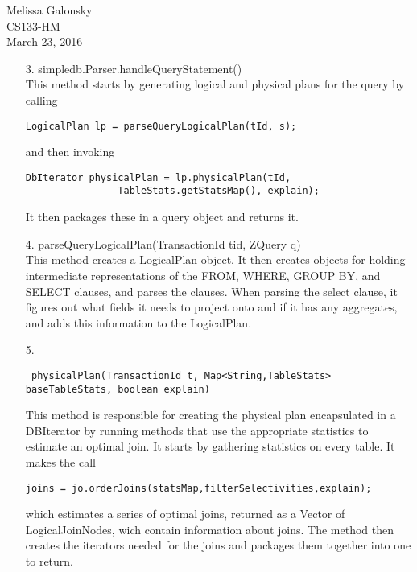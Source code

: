 \documentclass{article}
\begin{document}
\begin{flushleft}
Melissa Galonsky\\
CS133-HM\\
March 23, 2016\\
\end{flushleft}
\begin{enumerate}
\item[3.] simpledb.Parser.handleQueryStatement()\\
This method starts by generating logical and physical plans for the query by calling
\begin{verbatim}
LogicalPlan lp = parseQueryLogicalPlan(tId, s);
\end{verbatim}
and then invoking
\begin{verbatim}
DbIterator physicalPlan = lp.physicalPlan(tId,
                TableStats.getStatsMap(), explain);
\end{verbatim}
It then packages these in a query object and returns it.  
\item[4.] parseQueryLogicalPlan(TransactionId tid, ZQuery q)\\
This method creates a LogicalPlan object.  It then creates objects for holding intermediate representations of the FROM, WHERE, GROUP BY, and SELECT clauses, and parses the clauses.  When parsing the select clause, it figures out what fields it needs to project onto and if it has any aggregates, and adds this information to the LogicalPlan.
\item[5.] \begin{verbatim} physicalPlan(TransactionId t, Map<String,TableStats> baseTableStats, boolean explain)\end{verbatim}
                This method is responsible for creating the physical plan encapsulated in a DBIterator by running methods that use the appropriate statistics to estimate an optimal join.  It starts by gathering statistics on every table.  It makes the call
\begin{verbatim}
joins = jo.orderJoins(statsMap,filterSelectivities,explain);
\end{verbatim} which estimates a series of optimal joins, returned as a Vector of LogicalJoinNodes, wich contain information about joins.  The method then creates the iterators needed for the joins and packages them together into one to return.
\end{enumerate}
\end{document}

